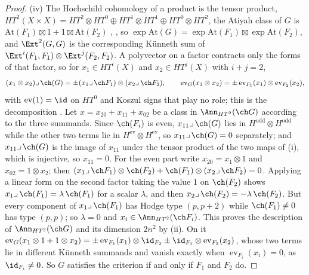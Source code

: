 \begin{proof}
(iv) The Hochschild cohomology of a product is the tensor product,
$HT^{2}(X\times X)=HT^{2}\otimes HT^{0}\oplus HT^{1}\otimes HT^{1}\oplus
HT^{0}\otimes HT^{2}$, the Atiyah class of $G$ is
$\mathrm{At}(F_{1})\boxtimes1+1\boxtimes\mathrm{At}(F_{2})$ \cite[Proposition 3.14]{BF03},
\cite[(8.4.1)]{Mar25a}, so $\exp\mathrm{At}(G)=\exp\mathrm{At}(F_{1})\boxtimes
\exp\mathrm{At}(F_{2})$, and $\Ext^{2}(G,G)$ is the corresponding K\"unneth
sum of $\Ext^{i}(F_{1},F_{1})\otimes\Ext^{j}(F_{2},F_{2})$. A polyvector on a
factor contracts only the forms of that factor, so for $x_{1}\in HT^{i}(X)$
and $x_{2}\in HT^{j}(X)$ with $i+j=2$,
\[
  (x_{1}\otimes x_{2})\lrcorner\,\ch(G)=\pm(x_{1}\lrcorner\,\ch F_{1})\otimes
  (x_{2}\lrcorner\,\ch F_{2}),\qquad
  \operatorname{ev}_{G}(x_{1}\otimes x_{2})=\pm\operatorname{ev}_{F_{1}}(x_{1})
  \otimes\operatorname{ev}_{F_{2}}(x_{2}),
\]
with $\operatorname{ev}(1)=\id$ on $HT^{0}$ and Koszul signs that play no
role; this is the decomposition \cite[(8.4.2), (8.4.3)]{Mar25a}. Let
$x=x_{20}+x_{11}+x_{02}$ be a class in $\Ann_{HT^{2}}(\ch G)$ according to the
three summands. Since $\ch(F_{i})$ is even, $x_{11}\lrcorner\,\ch(G)$ lies in
$H^{\mathrm{odd}}\otimes H^{\mathrm{odd}}$ while the other two terms lie in
$H^{\mathrm{ev}}\otimes H^{\mathrm{ev}}$, so $x_{11}\lrcorner\,\ch(G)=0$
separately; and $x_{11}\lrcorner\,\ch(G)$ is the image of $x_{11}$ under the
tensor product of the two maps of (i), which is injective, so $x_{11}=0$. For
the even part write $x_{20}=x_{1}\otimes1$ and $x_{02}=1\otimes x_{2}$; then
$(x_{1}\lrcorner\,\ch F_{1})\otimes\ch(F_{2})+\ch(F_{1})\otimes(x_{2}\lrcorner\,\ch F_{2})=0$.
Applying a linear form on the second factor taking the value $1$ on
$\ch(F_{2})$ shows $x_{1}\lrcorner\,\ch(F_{1})=\lambda\,\ch(F_{1})$ for a
scalar $\lambda$, and then $x_{2}\lrcorner\,\ch(F_{2})=-\lambda\,\ch(F_{2})$.
But every component of $x_{1}\lrcorner\,\ch(F_{1})$ has Hodge type $(p,p+2)$
while $\ch(F_{1})\ne0$ has type $(p,p)$; so $\lambda=0$ and
$x_{i}\in\Ann_{HT^{2}}(\ch F_{i})$. This proves the description of
$\Ann_{HT^{2}}(\ch G)$ and its dimension $2n^{2}$ by (ii). On it
$\operatorname{ev}_{G}(x_{1}\otimes1+1\otimes x_{2})=\pm\operatorname{ev}_{F_{1}}(x_{1})
\otimes\id_{F_{2}}\pm\id_{F_{1}}\otimes\operatorname{ev}_{F_{2}}(x_{2})$, whose
two terms lie in different K\"unneth summands and vanish exactly when
$\operatorname{ev}_{F_{i}}(x_{i})=0$, as $\id_{F_{i}}\ne0$. So $G$ satisfies
the criterion if and only if $F_{1}$ and $F_{2}$ do.


\end{proof}
